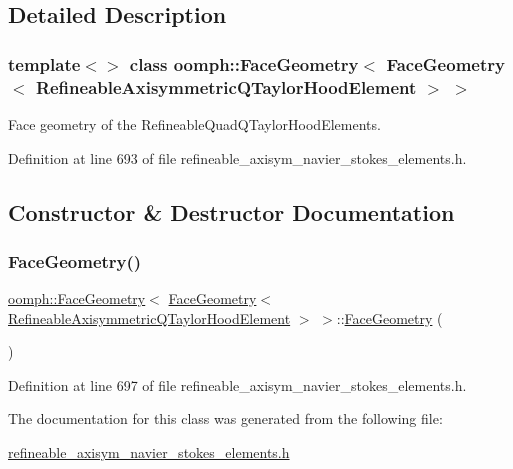 \subsection{Detailed Description}
\subsubsection*{template$<$$>$\newline
class oomph\+::\+Face\+Geometry$<$ Face\+Geometry$<$ Refineable\+Axisymmetric\+Q\+Taylor\+Hood\+Element $>$ $>$}

Face geometry of the Refineable\+Quad\+Q\+Taylor\+Hood\+Elements. 

Definition at line 693 of file refineable\+\_\+axisym\+\_\+navier\+\_\+stokes\+\_\+elements.\+h.



\subsection{Constructor \& Destructor Documentation}
\mbox{\label{classoomph_1_1FaceGeometry_3_01FaceGeometry_3_01RefineableAxisymmetricQTaylorHoodElement_01_4_01_4_af56e8f7646fa13d0abae9756943d551d}} 
\subsubsection{\texorpdfstring{Face\+Geometry()}{FaceGeometry()}}
{\footnotesize\ttfamily \hyperlink{classoomph_1_1FaceGeometry}{oomph\+::\+Face\+Geometry}$<$ \hyperlink{classoomph_1_1FaceGeometry}{Face\+Geometry}$<$ \hyperlink{classoomph_1_1RefineableAxisymmetricQTaylorHoodElement}{Refineable\+Axisymmetric\+Q\+Taylor\+Hood\+Element} $>$ $>$\+::\hyperlink{classoomph_1_1FaceGeometry}{Face\+Geometry} (\begin{DoxyParamCaption}{ }\end{DoxyParamCaption})\hspace{0.3cm}{\ttfamily [inline]}}



Definition at line 697 of file refineable\+\_\+axisym\+\_\+navier\+\_\+stokes\+\_\+elements.\+h.



The documentation for this class was generated from the following file\+:\begin{DoxyCompactItemize}
\item 
\hyperlink{refineable__axisym__navier__stokes__elements_8h}{refineable\+\_\+axisym\+\_\+navier\+\_\+stokes\+\_\+elements.\+h}\end{DoxyCompactItemize}
